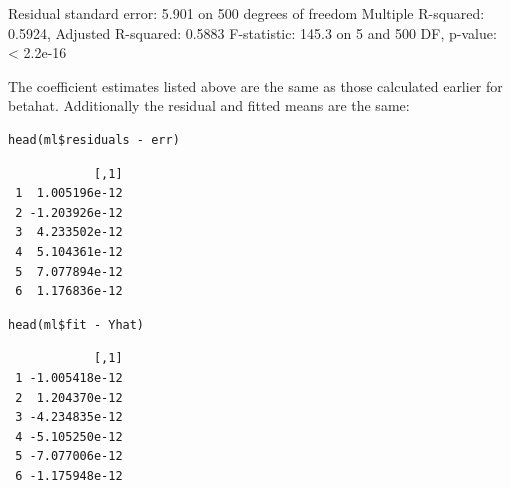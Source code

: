 \documentclass[11pt]{article}
\begin{document}
Residual standard error: 5.901 on 500 degrees of freedom
Multiple R-squared:  0.5924,    Adjusted R-squared:  0.5883 
F-statistic: 145.3 on 5 and 500 DF,  p-value: < 2.2e-16


The coefficient estimates listed above are the same as those
calculated earlier for betahat. Additionally the residual and fitted
means are the same:


\begin{verbatim}
head(ml$residuals - err)
\end{verbatim}

\begin{verbatim}
            [,1]
 1  1.005196e-12
 2 -1.203926e-12
 3  4.233502e-12
 4  5.104361e-12
 5  7.077894e-12
 6  1.176836e-12
\end{verbatim}



\begin{verbatim}
head(ml$fit - Yhat)
\end{verbatim}

\begin{verbatim}
            [,1]
 1 -1.005418e-12
 2  1.204370e-12
 3 -4.234835e-12
 4 -5.105250e-12
 5 -7.077006e-12
 6 -1.175948e-12
\end{verbatim}
\end{document}
